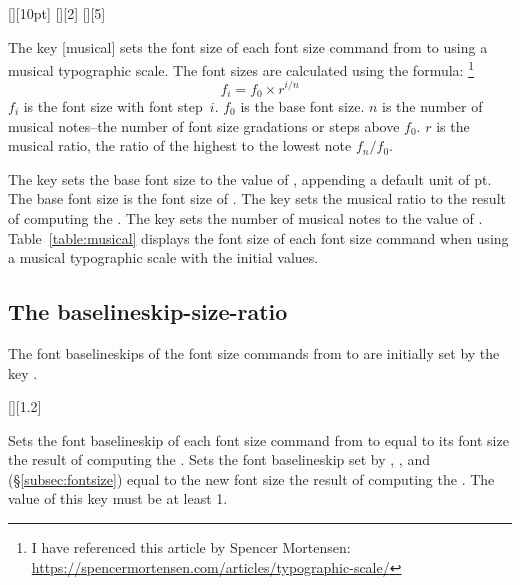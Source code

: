 \documentclass{beery}
\begin{document}
[][10pt]%
\nopagebreak\newline
{}[][2]%
\nopagebreak\newline
{}[][5]

The key [musical] sets the font size of each font size command from  to  using a musical typographic scale.
The font sizes are calculated using the formula:%
\footnote
  {%
    I have referenced this article by Spencer Mortensen:
    \newline
    \url{https://spencermortensen.com/articles/typographic-scale/}%
  }
\begin{equation}\label{eq:musical}
  f_i = f_0 \times r ^ { i / n }
\end{equation}
$f_i$ is the font size with font step~$i$.
$f_0$ is the base font size.
$n$ is the number of musical notes\---the number of font size gradations or steps above $f_0$.
$r$ is the musical ratio, the ratio of the highest to the lowest note $ f_n / f_0 $.

The key  sets the base font size to the value of , appending a default unit of \unit{pt}.
The base font size is the font size of .
The key  sets the musical ratio to the result of computing the .
The key  sets the number of musical notes to the value of .
Table~\ref{table:musical} displays the font size of each font size command when using a musical typographic scale with the initial values.



\subsection{The baselineskip-size-ratio}
\label{subsec:baselineskipsizeratio}

The font baselineskips of the font size commands from  to  are initially set by the key .

[][1.2]
\KeepNextPar*

Sets the font baselineskip of each font size command from  to  equal to its font size \texttimes{} the result of computing the .
Sets the font baselineskip set by , , and  (\S\ref{subsec:fontsize}) equal to the new font size \texttimes{} the result of computing the .
The value of this key must be at least \num{1}.
\end{document}
